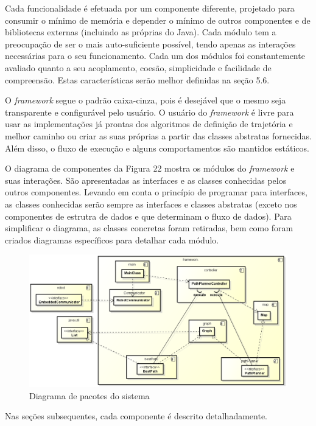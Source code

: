 Cada funcionalidade é efetuada por um componente diferente, projetado para consumir o mínimo de memória e depender o mínimo de outros componentes e de bibliotecas externas (incluindo as próprias do Java). Cada módulo tem a preocupação de ser o mais auto-suficiente possível, tendo apenas as interações necessárias para o seu funcionamento. Cada um dos módulos foi constantemente avaliado quanto a seu acoplamento, coesão,  simplicidade e facilidade de compreensão. Estas características serão melhor definidas na seção 5.6.

O \textit{framework} segue o padrão caixa-cinza, pois é desejável que o mesmo seja transparente e configurável pelo usuário. O usuário do \textit{framework} é livre para usar as implementações já prontas dos algoritmos de definição de trajetória e melhor caminho ou criar as suas próprias a partir das classes abstratas fornecidas. Além disso, o fluxo de execução e alguns comportamentos são mantidos estáticos.

O diagrama de componentes da Figura 22 mostra os módulos do \textit{framework} e suas interações. São apresentadas as interfaces e as classes conhecidas pelos outros componentes. Levando em conta o princípio de programar para interfaces, as classes conhecidas serão sempre as interfaces e classes abstratas (exceto nos componentes de estrutra de dados e que determinam o fluxo de dados). Para simplificar o diagrama, as classes concretas foram retiradas, bem como foram criados diagramas específicos para detalhar cada módulo.

\begin{figure}[h]
	\centering
	\label{fig22}
		\includegraphics[keepaspectratio=true,scale=0.5]{figuras/componentes.png}
	\caption{Diagrama de pacotes do sistema}
\end{figure}

Nas seções subsequentes, cada componente é descrito detalhadamente.


